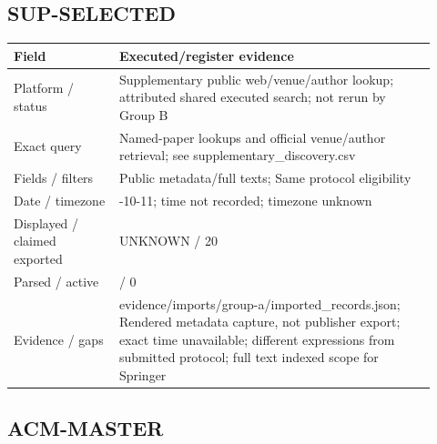 \documentclass[12pt,a4paper]{article}
\begin{document}
\subsection*{SUP-SELECTED}

{\small\begin{longtable}{>{\raggedright\arraybackslash}p{0.23\linewidth}>{\raggedright\arraybackslash}p{0.69\linewidth}}
\toprule
Field & Executed/\allowbreak{}register evidence\\\midrule
\endhead
Platform /\allowbreak{} status & Supplementary public web/\allowbreak{}venue/\allowbreak{}author lookup; attributed shared executed search; not rerun by Group B\\
Exact query & Named-paper lookups and official venue/\allowbreak{}author retrieval; see supplementary\_\allowbreak{}discovery.csv\\
Fields /\allowbreak{} filters & Public metadata/\allowbreak{}full texts; Same protocol eligibility\\
Date /\allowbreak{} timezone & 2026-10-11; time not recorded; timezone unknown\\
Displayed /\allowbreak{} claimed exported & UNKNOWN /\allowbreak{} 20\\
Parsed /\allowbreak{} active & 0 /\allowbreak{} 0\\
Evidence /\allowbreak{} gaps & evidence/\allowbreak{}imports/\allowbreak{}group-a/\allowbreak{}imported\_\allowbreak{}records.json; Rendered metadata capture, not publisher export; exact time unavailable; different expressions from submitted protocol; full text indexed scope for Springer\\
\bottomrule
\end{longtable}}

\subsection*{ACM-MASTER}
\end{document}
